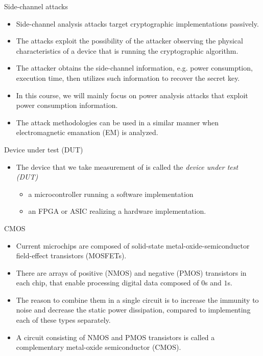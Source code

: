 \begin{frame}{Side-channel attacks}
    \begin{itemize}
        \item Side-channel analysis attacks target cryptographic implementations passively.
       \item The attacks exploit the possibility of the attacker observing the physical characteristics of a device that is running the cryptographic algorithm.
        \item The attacker obtains the side-channel information, e.g. power consumption, execution time, then utilizes such information to recover the secret key.
     \item  In this course, we will mainly focus on power analysis attacks that exploit power consumption information.
      \item The attack methodologies can be used in a similar manner when electromagnetic emanation (EM) is analyzed.
    \end{itemize}
\end{frame}

\begin{frame}{Device under test (DUT)}
    \begin{itemize}
        \item The device that we take measurement of is called the \textit{device under test (DUT)}
        \begin{itemize}
            \item a microcontroller running a software implementation
            \item an FPGA or ASIC realizing a hardware implementation.
        \end{itemize}
    \end{itemize}
\end{frame}


\begin{frame}{CMOS}
    \begin{itemize}
        \item Current microchips are composed of solid-state metal-oxide-semiconductor field-effect transistors (MOSFETs).
        \item There are arrays of positive (NMOS) and negative (PMOS) transistors in each chip, that enable processing digital data composed of $0$s and $1$s. 
        \item The reason to combine them in a single circuit is to increase the immunity to noise and decrease the static power dissipation, compared to implementing each of these types separately.
        \item A circuit consisting of NMOS and PMOS transistors is called a complementary metal-oxide semiconductor (CMOS).
    \end{itemize}
\end{frame}

